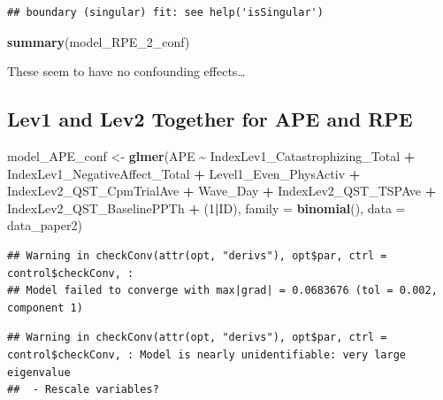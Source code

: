 \documentclass[
  12pt,
]{article}
\newenvironment{Shaded}{\begin{snugshade}}{\end{snugshade}}
\newcommand{\AttributeTok}[1]{\textcolor[rgb]{0.13,0.29,0.53}{#1}}
\newcommand{\DecValTok}[1]{\textcolor[rgb]{0.00,0.00,0.81}{#1}}
\newcommand{\FunctionTok}[1]{\textcolor[rgb]{0.13,0.29,0.53}{\textbf{#1}}}
\newcommand{\NormalTok}[1]{#1}
\newcommand{\OtherTok}[1]{\textcolor[rgb]{0.56,0.35,0.01}{#1}}
\newcommand{\SpecialCharTok}[1]{\textcolor[rgb]{0.81,0.36,0.00}{\textbf{#1}}}
\begin{document}
\begin{verbatim}
## boundary (singular) fit: see help('isSingular')
\end{verbatim}

\begin{Shaded}
\begin{Highlighting}[]
\FunctionTok{summary}\NormalTok{(model\_RPE\_2\_conf)}
\end{Highlighting}
\end{Shaded}

These seem to have no confounding effects\ldots{}

\hypertarget{lev1-and-lev2-together-for-ape-and-rpe}{%
\subsection{Lev1 and Lev2 Together for APE and
RPE}\label{lev1-and-lev2-together-for-ape-and-rpe}}

\begin{Shaded}
\begin{Highlighting}[]
\NormalTok{model\_APE\_conf }\OtherTok{\textless{}{-}} \FunctionTok{glmer}\NormalTok{(APE }\SpecialCharTok{\textasciitilde{}}\NormalTok{ IndexLev1\_Catastrophizing\_Total }\SpecialCharTok{+}\NormalTok{ IndexLev1\_NegativeAffect\_Total }\SpecialCharTok{+}\NormalTok{ Level1\_Even\_PhysActiv }\SpecialCharTok{+}\NormalTok{ IndexLev2\_QST\_CpmTrialAve }\SpecialCharTok{+}\NormalTok{ Wave\_Day }\SpecialCharTok{+}\NormalTok{ IndexLev2\_QST\_TSPAve }\SpecialCharTok{+}\NormalTok{ IndexLev2\_QST\_BaselinePPTh }\SpecialCharTok{+}\NormalTok{ (}\DecValTok{1}\SpecialCharTok{|}\NormalTok{ID), }\AttributeTok{family =} \FunctionTok{binomial}\NormalTok{(), }\AttributeTok{data =}\NormalTok{ data\_paper2)}
\end{Highlighting}
\end{Shaded}

\begin{verbatim}
## Warning in checkConv(attr(opt, "derivs"), opt$par, ctrl = control$checkConv, :
## Model failed to converge with max|grad| = 0.0683676 (tol = 0.002, component 1)
\end{verbatim}

\begin{verbatim}
## Warning in checkConv(attr(opt, "derivs"), opt$par, ctrl = control$checkConv, : Model is nearly unidentifiable: very large eigenvalue
##  - Rescale variables?
\end{verbatim}
\end{document}
